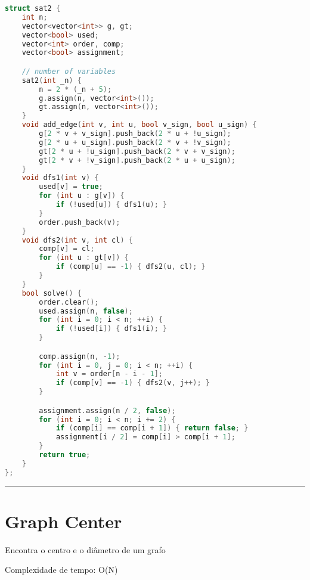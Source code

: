 \documentclass[11pt, a4paper, twoside]{book}
\begin{document}
\begin{lstlisting}[language=C++]
struct sat2 {
    int n;
    vector<vector<int>> g, gt;
    vector<bool> used;
    vector<int> order, comp;
    vector<bool> assignment;

    // number of variables
    sat2(int _n) {
        n = 2 * (_n + 5);
        g.assign(n, vector<int>());
        gt.assign(n, vector<int>());
    }
    void add_edge(int v, int u, bool v_sign, bool u_sign) {
        g[2 * v + v_sign].push_back(2 * u + !u_sign);
        g[2 * u + u_sign].push_back(2 * v + !v_sign);
        gt[2 * u + !u_sign].push_back(2 * v + v_sign);
        gt[2 * v + !v_sign].push_back(2 * u + u_sign);
    }
    void dfs1(int v) {
        used[v] = true;
        for (int u : g[v]) {
            if (!used[u]) { dfs1(u); }
        }
        order.push_back(v);
    }
    void dfs2(int v, int cl) {
        comp[v] = cl;
        for (int u : gt[v]) {
            if (comp[u] == -1) { dfs2(u, cl); }
        }
    }
    bool solve() {
        order.clear();
        used.assign(n, false);
        for (int i = 0; i < n; ++i) {
            if (!used[i]) { dfs1(i); }
        }

        comp.assign(n, -1);
        for (int i = 0, j = 0; i < n; ++i) {
            int v = order[n - i - 1];
            if (comp[v] == -1) { dfs2(v, j++); }
        }

        assignment.assign(n / 2, false);
        for (int i = 0; i < n; i += 2) {
            if (comp[i] == comp[i + 1]) { return false; }
            assignment[i / 2] = comp[i] > comp[i + 1];
        }
        return true;
    }
};
\end{lstlisting}

\hfill

\rule{\textwidth}{0.4pt}

\section{Graph Center}



Encontra o centro e o diâmetro de um grafo



Complexidade de tempo: O(N)


\hfill
\end{document}

